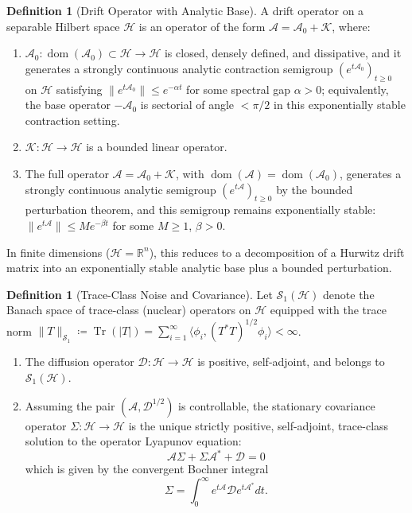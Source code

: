 \documentclass[11pt]{amsart}
\theoremstyle{plain}
\theoremstyle{definition}
\newtheorem{definition}[theorem]{Definition}
\theoremstyle{remark}
\newcommand{\tr}{\operatorname{Tr}}
\begin{document}
\begin{definition}[Drift Operator with Analytic Base]
  \label{def:drift_operator}
  A drift operator on a separable Hilbert space $\mathcal{H}$ is an operator of the form $\mathcal{A} = \mathcal{A}_0 + \mathcal{K}$, where:
  \begin{enumerate}
    \item[(i)] $\mathcal{A}_0: \operatorname{dom}(\mathcal{A}_0) \subset \mathcal{H} \to \mathcal{H}$ is closed, densely defined, and dissipative, and it generates a strongly continuous analytic contraction semigroup $(e^{t\mathcal{A}_0})_{t \ge 0}$ on $\mathcal{H}$ satisfying $\|e^{t\mathcal{A}_0}\| \le e^{-\alpha t}$ for some spectral gap $\alpha > 0$; equivalently, the base operator $-\mathcal{A}_0$ is sectorial of angle $<\pi/2$ in this exponentially stable contraction setting.
    \item[(ii)] $\mathcal{K}: \mathcal{H} \to \mathcal{H}$ is a bounded linear operator.
    \item[(iii)] The full operator $\mathcal{A} = \mathcal{A}_0 + \mathcal{K}$, with $\operatorname{dom}(\mathcal{A})=\operatorname{dom}(\mathcal{A}_0)$, generates a strongly continuous analytic semigroup $(e^{t\mathcal{A}})_{t \ge 0}$ by the bounded perturbation theorem, and this semigroup remains exponentially stable: $\|e^{t\mathcal{A}}\| \le M e^{-\beta t}$ for some $M \ge 1$, $\beta > 0$.
  \end{enumerate}
  In finite dimensions ($\mathcal{H} = \mathbb{R}^n$), this reduces to a decomposition of a Hurwitz drift matrix into an exponentially stable analytic base plus a bounded perturbation.
\end{definition}

\begin{definition}[Trace-Class Noise and Covariance]
  \label{def:trace_class}
  Let $\mathcal{S}_1(\mathcal{H})$ denote the Banach space of trace-class (nuclear) operators on $\mathcal{H}$ equipped with the trace norm $\|T\|_{\mathcal{S}_1} \coloneqq \tr(|T|) = \sum_{i=1}^\infty \langle \phi_i, (T^*T)^{1/2} \phi_i \rangle < \infty$.
  \begin{enumerate}
    \item[(i)] The diffusion operator $\mathcal{D}: \mathcal{H} \to \mathcal{H}$ is positive, self-adjoint, and belongs to $\mathcal{S}_1(\mathcal{H})$.
    \item[(ii)] Assuming the pair $(\mathcal{A}, \mathcal{D}^{1/2})$ is controllable, the stationary covariance operator $\Sigma: \mathcal{H} \to \mathcal{H}$ is the unique strictly positive, self-adjoint, trace-class solution to the operator Lyapunov equation:
    \begin{equation}
      \label{eq:op_lyapunov}
      \mathcal{A}\Sigma + \Sigma\mathcal{A}^* + \mathcal{D} = 0
    \end{equation}
    which is given by the convergent Bochner integral
    \[
      \Sigma = \int_0^\infty e^{t\mathcal{A}} \mathcal{D} e^{t\mathcal{A}^*} dt.
    \]
  \end{enumerate}
\end{definition}
\end{document}
